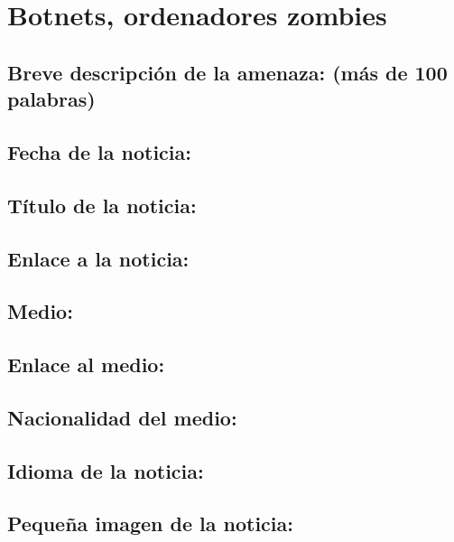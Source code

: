 \chapter{Botnets, ordenadores zombies}

    \section{Breve descripción de la amenaza: (más de 100 palabras)}


    \section{Fecha de la noticia:}
   
    \section{Título de la noticia:}

    \href{}{}

    \section{Enlace a la noticia:}

    \href{}{}

    \section{Medio:}

    
    \section{Enlace al medio:}

    \href{}{}

    \section{Nacionalidad del medio:}
 
    
    \section{Idioma de la noticia:}

    
    \section{Pequeña imagen de la noticia:}
 
